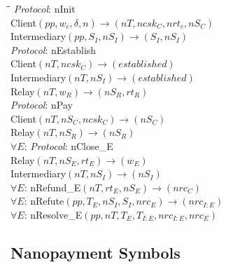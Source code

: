\documentclass{article}
\begin{document}
\begin{onehalfspacing}
  \begin{tabbing}
    \hspace*{1cm}\= \hspace*{1cm}\= \kill
    \> \emph{Protocol}: nInit \\
    \> \> Client$(pp, w_c, \delta, n) \rightarrow (nT, ncsk_C, nrt_c, nS_C)$ \\
    \> \> Intermediary$(pp, S_I, nS_I) \rightarrow (S_I, nS_I)$ \\
    \> \emph{Protocol}: nEstablish \\
    \> \> Client$(nT, ncsk_C) \rightarrow (established)$ \\
    \> \> Intermediary$(nT, nS_I) \rightarrow (established)$ \\
    \> \> Relay$(nT, w_R) \rightarrow (nS_R, rt_R) $ \\
    \> \emph{Protocol}: nPay \\
    \> \> Client$(nT, nS_C, ncsk_C) \rightarrow (nS_C)$ \\
    \> \> Relay$(nT, nS_R) \rightarrow (nS_R)$ \\
    $\forall E$: \> \emph{Protocol}: nClose\_E \\
    \> \> Relay$(nT, nS_E, rt_E) \rightarrow (w_E)$ \\
    \> \> Intermediary$(nT, nS_I) \rightarrow (nS_I)$ \\
    $\forall E$: \> nRefund\_E$(nT, rt_E, nS_E) \rightarrow (nrc_C) $ \\
    $\forall E$: \> nRefute$(pp, T_E, nS_I, S_I, nrc_E) \rightarrow (nrc_{I:E})$ \\
    $\forall E$: \> nResolve\_E$(pp, nT, T_E, T_{I:E}, nrc_{I:E}, nrc_E)$
  \end{tabbing}
\end{onehalfspacing}

\subsection{Nanopayment Symbols}
\end{document}
